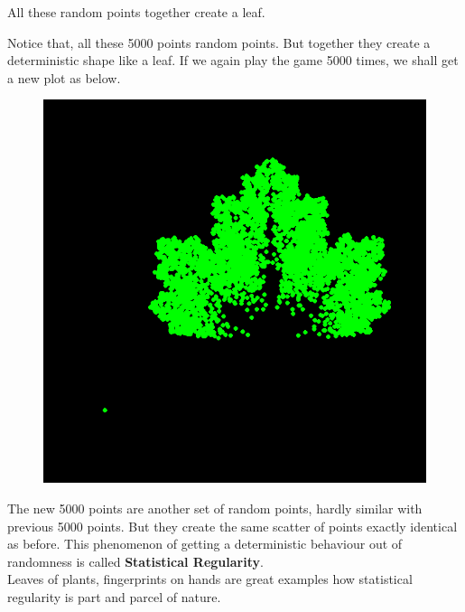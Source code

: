 \documentclass[11pt, a4paper]{article}
\begin{document}
All these random points together create a leaf.

\newpage

Notice that, all these 5000 points random points. But together they create a deterministic shape like a leaf. If we again play the game 5000 times, we shall get a new plot as below.

\begin{figure}[h]
\centering
\includegraphics[scale=0.3]{06}
\end{figure}

The new 5000 points are another set of random points, hardly similar with previous 5000 points. But they create the same scatter of points exactly identical as before. This phenomenon of getting a deterministic behaviour out of randomness is called \textbf{Statistical Regularity}. \\

\hspace{0.5cm} Leaves of plants, fingerprints on hands are great examples how statistical regularity is part and parcel of nature.
\end{document}
